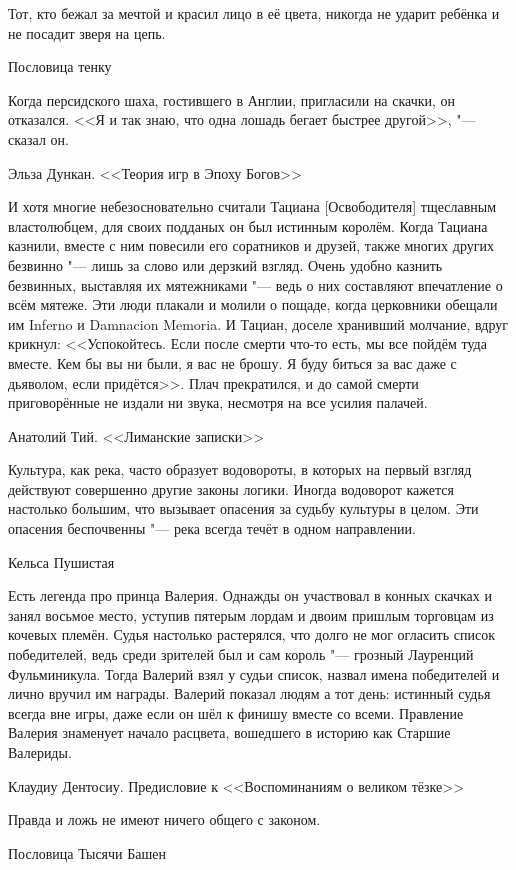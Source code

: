 \epigraph
{Тот, кто бежал за мечтой и красил лицо в её цвета, никогда не ударит ребёнка и не посадит зверя на цепь.}
{Пословица тенку}

\epigraph
{Когда персидского шаха, гостившего в Англии, пригласили на скачки, он отказался.
<<Я и так знаю, что одна лошадь бегает быстрее другой>>, "--- сказал он.}
{Эльза Дункан.
<<Теория игр в Эпоху Богов>>}

\epigraph
{\ldotst И хотя многие небезосновательно считали Тациана [Освободителя] тщеславным властолюбцем, для своих подданых он был истинным королём.
Когда Тациана казнили, вместе с ним повесили его соратников и друзей, также многих других безвинно "--- лишь за слово или дерзкий взгляд.
Очень удобно казнить безвинных, выставляя их мятежниками "--- ведь о них составляют впечатление о всём мятеже.
Эти люди плакали и молили о пощаде, когда церковники обещали им Inferno\footnotemark{} и Damnacion Memoria\footnotemark.
И Тациан, доселе хранивший молчание, вдруг крикнул: <<Успокойтесь.
Если после смерти что-то есть, мы все пойдём туда вместе.
Кем бы вы ни были, я вас не брошу.
Я буду биться за вас даже с дьяволом, если придётся>>.
Плач прекратился, и до самой смерти приговорённые не издали ни звука, несмотря на все усилия палачей.}
{Анатолий Тий.
<<Лиманские записки>>}

\epigraph
{Культура, как река, часто образует водовороты, в которых на первый взгляд действуют совершенно другие законы логики.
Иногда водоворот кажется настолько большим, что вызывает опасения за судьбу культуры в целом.
Эти опасения беспочвенны "--- река всегда течёт в одном направлении.}
{Кельса Пушистая}

\epigraph
{Есть легенда про принца Валерия.
Однажды он участвовал в конных скачках и занял восьмое место, уступив пятерым лордам и двоим пришлым торговцам из кочевых племён.
Судья настолько растерялся, что долго не мог огласить список победителей, ведь среди зрителей был и сам король "--- грозный Лауренций Фульминикула.
Тогда Валерий взял у судьи список, назвал имена победителей и лично вручил им награды.
Валерий показал людям а тот день: истинный судья всегда вне игры, даже если он шёл к финишу вместе со всеми.
Правление Валерия знаменует начало расцвета, вошедшего в историю как Старшие Валериды.}
{Клаудиу Дентосиу.
Предисловие к <<Воспоминаниям о великом тёзке>>}

\epigraph
{Правда и ложь не имеют ничего общего с законом.}
{Пословица Тысячи Башен}

